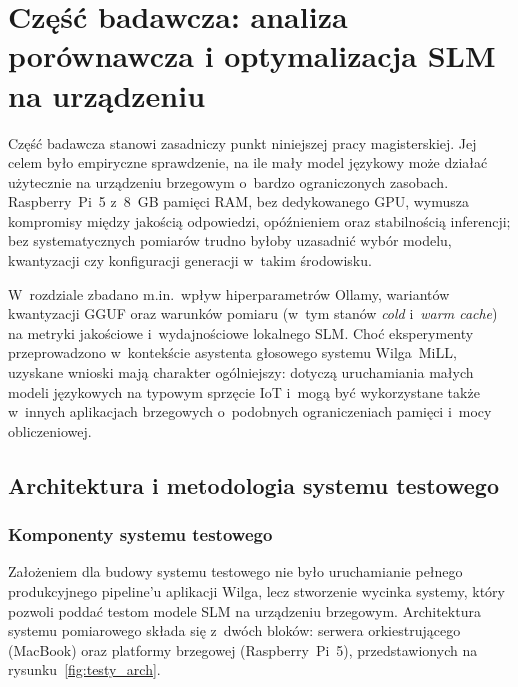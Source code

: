 
\newpage
\graphicspath{{data/5 - badania/wykresy/}}
\section{Część badawcza: analiza porównawcza i optymalizacja SLM na urządzeniu}
\label{sec:modele}

Część badawcza stanowi zasadniczy punkt niniejszej pracy magisterskiej.
Jej celem było empiryczne sprawdzenie, na ile mały model językowy może
działać użytecznie na urządzeniu brzegowym o~bardzo ograniczonych zasobach.
Raspberry~Pi~5 z~8~GB pamięci RAM, bez dedykowanego GPU, wymusza kompromisy
między jakością odpowiedzi, opóźnieniem oraz stabilnością inferencji; bez
systematycznych pomiarów trudno byłoby uzasadnić wybór modelu, kwantyzacji
czy konfiguracji generacji w~takim środowisku.

W~rozdziale zbadano m.in.\ wpływ hiperparametrów Ollamy, wariantów kwantyzacji
GGUF oraz warunków pomiaru (w~tym stanów \emph{cold} i~\emph{warm cache})
na metryki jakościowe i~wydajnościowe lokalnego SLM. Choć eksperymenty
przeprowadzono w~kontekście asystenta głosowego systemu Wilga~MiLL, uzyskane
wnioski mają charakter ogólniejszy: dotyczą uruchamiania małych modeli
językowych na typowym sprzęcie IoT i~mogą być wykorzystane także w~innych
aplikacjach brzegowych o~podobnych ograniczeniach pamięci i~mocy obliczeniowej.

\subsection{Architektura i metodologia systemu testowego}
\label{subsec:metodologia}

\subsubsection{Komponenty systemu testowego}

Założeniem dla budowy systemu testowego nie było uruchamianie pełnego produkcyjnego pipeline'u aplikacji Wilga, lecz
stworzenie wycinka systemy, który pozwoli poddać testom modele SLM na urządzeniu brzegowym. Architektura systemu pomiarowego składa
się z~dwóch bloków: serwera orkiestrującego (MacBook) oraz
platformy brzegowej (Raspberry~Pi~5), przedstawionych na
rysunku~\ref{fig:testy_arch}.


